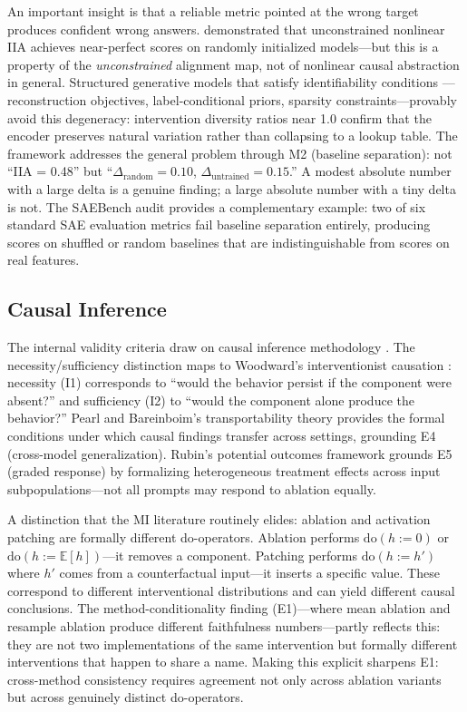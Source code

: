 \documentclass{article}
\begin{document}
An important insight is that a reliable metric pointed at the wrong target produces confident wrong answers. \citet{sutter2025nonlinear} demonstrated that unconstrained nonlinear IIA achieves near-perfect scores on randomly initialized models---but this is a property of the \emph{unconstrained} alignment map, not of nonlinear causal abstraction in general. Structured generative models that satisfy identifiability conditions \citep{khemakhem2020variational}---reconstruction objectives, label-conditional priors, sparsity constraints---provably avoid this degeneracy: intervention diversity ratios near 1.0 confirm that the encoder preserves natural variation rather than collapsing to a lookup table. The framework addresses the general problem through M2 (baseline separation): not ``IIA = 0.48'' but ``$\Delta_{\text{random}} = 0.10$, $\Delta_{\text{untrained}} = 0.15$.'' A modest absolute number with a large delta is a genuine finding; a large absolute number with a tiny delta is not. The SAEBench audit \citep{karvonen2025saebench} provides a complementary example: two of six standard SAE evaluation metrics fail baseline separation entirely, producing scores on shuffled or random baselines that are indistinguishable from scores on real features.


\subsection{Causal Inference}
\label{sec:causal}

The internal validity criteria draw on causal inference methodology \citep{pearl2009causality, spirtes2000causation}. The necessity/sufficiency distinction maps to Woodward's interventionist causation \citep{woodward2003making}: necessity (I1) corresponds to ``would the behavior persist if the component were absent?'' and sufficiency (I2) to ``would the component alone produce the behavior?'' Pearl and Bareinboim's transportability theory \citep{pearl2011transportability} provides the formal conditions under which causal findings transfer across settings, grounding E4 (cross-model generalization). Rubin's potential outcomes framework grounds E5 (graded response) by formalizing heterogeneous treatment effects across input subpopulations---not all prompts may respond to ablation equally.

A distinction that the MI literature routinely elides: ablation and activation patching are formally different do-operators. Ablation performs $\mathrm{do}(h := 0)$ or $\mathrm{do}(h := \mathbb{E}[h])$---it removes a component. Patching performs $\mathrm{do}(h := h')$ where $h'$ comes from a counterfactual input---it inserts a specific value. These correspond to different interventional distributions and can yield different causal conclusions. The method-conditionality finding (E1)---where mean ablation and resample ablation produce different faithfulness numbers---partly reflects this: they are not two implementations of the same intervention but formally different interventions that happen to share a name. Making this explicit sharpens E1: cross-method consistency requires agreement not only across ablation variants but across genuinely distinct do-operators.
\end{document}

